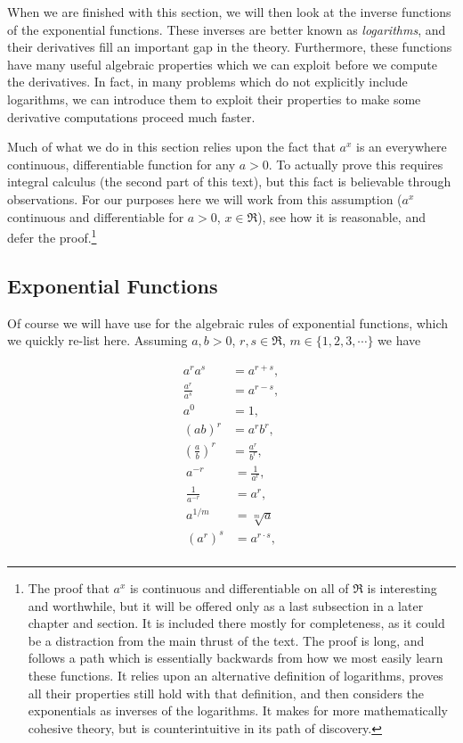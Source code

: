 When we are finished with this section, we will then look at the
inverse functions of the exponential functions.  These inverses
are better known as {\it logarithms}, and their derivatives fill
an important gap in the theory.  Furthermore, these functions
have many useful algebraic properties which we can exploit before
we compute the derivatives.  In fact, in many  problems which do not
explicitly include logarithms, we can introduce them to exploit their
properties to make some derivative computations proceed much faster.

Much of what we do in this section relies upon the fact that
$a^x$ is an everywhere continuous, differentiable function for any $a>0$.
To actually prove this requires integral calculus (the second
part of this text), but this fact is believable through observations.
For our purposes here we will work from this assumption
($a^x$ continuous and differentiable for $a>0$, $x\in\Re$),
see how it is reasonable,  
and defer the proof.\footnote{%
The proof that $a^x$ is continuous and differentiable on all of $\Re$
is interesting and worthwhile, but it will be offered
only as a last subsection in a later chapter and section.
It is included there mostly for completeness, as it could be a distraction
from the main thrust of the text.  The proof is  long, and follows a path
which is essentially backwards from how we most easily learn these functions.
It relies upon an alternative definition of logarithms, proves all their
properties still hold with that definition, and then considers
the exponentials as inverses of the logarithms.  It makes for
more mathematically cohesive theory, but is 
counterintuitive in its path of discovery.
}
\subsection{Exponential Functions}

Of course we will have use for the algebraic
rules of exponential functions, which we quickly re-list here.
Assuming $a,b>0$, $r,s\in\Re$,  $m\in\{1,2,3,\cdots\}$ we have
\begin{multicols}{2}
\begin{align*}
a^{r}a^s&=a^{r+s},\\
\frac{a^r}{a^s}&=a^{r-s},\\
a^0&=1,\\
(ab)^r&=a^rb^r,\\
\left(\frac{a}{b}\right)^r&=\frac{a^r}{b^r},\end{align*}\vfill
\begin{align*}
a^{-r}&=\frac1{a^r},\\
\frac1{a^{-r}}&=a^r,\\
a^{1/m}&=\sqrt[m]{a}\\
\left(a^r\right)^s&=a^{r\cdot s},
\\
\end{align*}\end{multicols}

